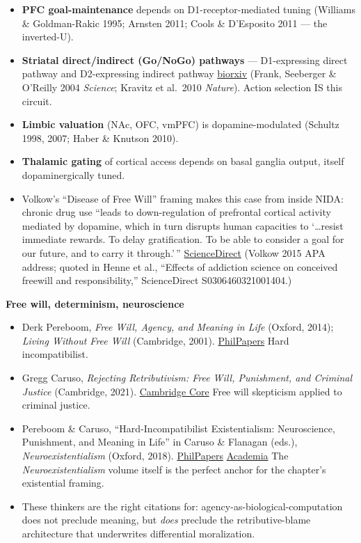 \begin{itemize}
\tightlist
\item
  \textbf{PFC goal-maintenance} depends on D1-receptor-mediated tuning (Williams \& Goldman-Rakic 1995; Arnsten 2011; Cools \& D'Esposito 2011 --- the inverted-U).
\item
  \textbf{Striatal direct/indirect (Go/NoGo) pathways} --- D1-expressing direct pathway and D2-expressing indirect pathway \href{https://www.biorxiv.org/content/10.1101/2022.10.29.514339.full.pdf}{biorxiv} (Frank, Seeberger \& O'Reilly 2004 \emph{Science}; Kravitz et al.~2010 \emph{Nature}). Action selection IS this circuit.
\item
  \textbf{Limbic valuation} (NAc, OFC, vmPFC) is dopamine-modulated (Schultz 1998, 2007; Haber \& Knutson 2010).
\item
  \textbf{Thalamic gating} of cortical access depends on basal ganglia output, itself dopaminergically tuned.
\item
  Volkow's ``Disease of Free Will'' framing makes this case from inside NIDA: chronic drug use ``leads to down-regulation of prefrontal cortical activity mediated by dopamine, which in turn disrupts human capacities to `\ldots resist immediate rewards. To delay gratification. To be able to consider a goal for our future, and to carry it through.'\,'' \href{https://www.sciencedirect.com/science/article/abs/pii/S0306460321001404}{ScienceDirect} (Volkow 2015 APA address; quoted in Henne et al., ``Effects of addiction science on conceived freewill and responsibility,'' ScienceDirect S0306460321001404.)
\end{itemize}

\textbf{Free will, determinism, neuroscience}

\begin{itemize}
\tightlist
\item
  Derk Pereboom, \emph{Free Will, Agency, and Meaning in Life} (Oxford, 2014); \emph{Living Without Free Will} (Cambridge, 2001). \href{https://philpapers.org/rec/CARPOD-2}{PhilPapers} Hard incompatibilist.
\item
  Gregg Caruso, \emph{Rejecting Retributivism: Free Will, Punishment, and Criminal Justice} (Cambridge, 2021). \href{https://www.cambridge.org/core/books/moral-responsibility-reconsidered/0DD200C8E84E6458EA56A098BC7E206F}{Cambridge Core} Free will skepticism applied to criminal justice.
\item
  Pereboom \& Caruso, ``Hard-Incompatibilist Existentialism: Neuroscience, Punishment, and Meaning in Life'' in Caruso \& Flanagan (eds.), \emph{Neuroexistentialism} (Oxford, 2018). \href{https://philpapers.org/rec/CARPOD-2}{PhilPapers} \href{https://cornell.academia.edu/DerkPereboom}{Academia} The \emph{Neuroexistentialism} volume itself is the perfect anchor for the chapter's existential framing.
\item
  These thinkers are the right citations for: agency-as-biological-computation does not preclude meaning, but \emph{does} preclude the retributive-blame architecture that underwrites differential moralization.
\end{itemize}

